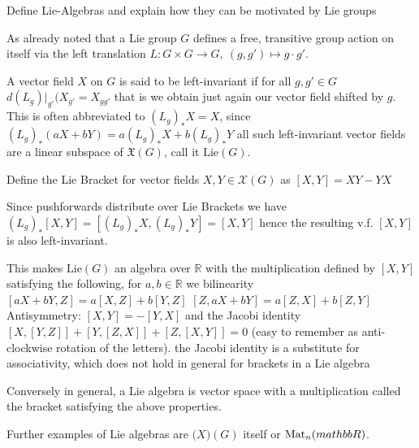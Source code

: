Define Lie-Algebras and explain how they can be motivated by Lie groups

As already noted that a Lie group \( G \) defines a free, transitive group action on itself
via the left translation \( L : G \times G \to G,\ (g, g') \mapsto g\cdot g' \).

A vector field \( X \) on \( G \) is said to be left-invariant if for all \( g, g' \in G \)
\( d(L_g)|_{g'}(X_{g'} = X_{gg'} \)
that is we obtain just again our vector field shifted by \( g \). 
This is often abbreviated to \( (L_g)_{\ast}X = X \),
since \( (L_g)_{\ast}(aX + bY) = a(L_g)_{\ast}X + b(L_g)_{\ast}Y \) all such left-invariant vector fields
are a linear subspace of \( \mathfrak{X}(G) \), call it \( \text{Lie}(G) \).

Define the Lie Bracket for vector fields \( X, Y \in \mathcal{X}(G) \) as 
\( [X, Y] = XY - YX \)

Since pushforwards distribute over Lie Brackets we have
\( (L_{g})_{\ast}[X, Y] = [(L_{g})_{\ast}X,(L_{g})_{\ast}Y] = [X, Y]  \) hence the resulting v.f. \( [X, Y] \)
is also left-invariant.

This makes \( \text{Lie}(G) \) an algebra over \( \mathbb{R} \)
with the multiplication defined by \( [X, Y] \) satisfying the following,
for \( a, b \in \mathbb{R} \) we bilinearity
\([aX + bY, Z] = a[X, Z] + b[Y, Z]\)
\([Z, aX + bY] = a[Z, X] + b[Z, Y]\)
Antisymmetry:
\( [X, Y] = -[Y, X] \)
and the Jacobi identity
\( [X, [Y, Z]] + [Y, [Z, X]] + [Z, [X, Y]] = 0\)
(easy to remember as anti-clockwise rotation of the letters).
the Jacobi identity is a substitute for associativity, which does not hold
in general for brackets in a Lie algebra

Conversely in general, a Lie algebra is vector space with a multiplication called the bracket satisfying the above properties.

Further examples of Lie algebras are \( \mathcal(X)(G) \) itself or \( \text{Mat}_n(\\mathbb{R}) \).

